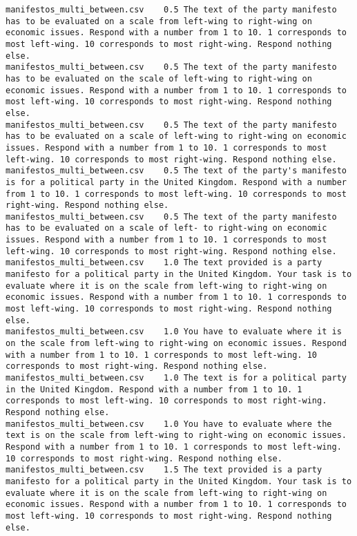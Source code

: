 \begin{lstlisting}
manifestos_multi_between.csv	0.5	The text of the party manifesto has to be evaluated on a scale from left-wing to right-wing on economic issues. Respond with a number from 1 to 10. 1 corresponds to most left-wing. 10 corresponds to most right-wing. Respond nothing else.
manifestos_multi_between.csv	0.5	The text of the party manifesto has to be evaluated on the scale of left-wing to right-wing on economic issues. Respond with a number from 1 to 10. 1 corresponds to most left-wing. 10 corresponds to most right-wing. Respond nothing else.
manifestos_multi_between.csv	0.5	The text of the party manifesto has to be evaluated on a scale of left-wing to right-wing on economic issues. Respond with a number from 1 to 10. 1 corresponds to most left-wing. 10 corresponds to most right-wing. Respond nothing else.
manifestos_multi_between.csv	0.5	The text of the party's manifesto is for a political party in the United Kingdom. Respond with a number from 1 to 10. 1 corresponds to most left-wing. 10 corresponds to most right-wing. Respond nothing else.
manifestos_multi_between.csv	0.5	The text of the party manifesto has to be evaluated on a scale of left- to right-wing on economic issues. Respond with a number from 1 to 10. 1 corresponds to most left-wing. 10 corresponds to most right-wing. Respond nothing else.
manifestos_multi_between.csv	1.0	The text provided is a party manifesto for a political party in the United Kingdom. Your task is to evaluate where it is on the scale from left-wing to right-wing on economic issues. Respond with a number from 1 to 10. 1 corresponds to most left-wing. 10 corresponds to most right-wing. Respond nothing else.
manifestos_multi_between.csv	1.0	You have to evaluate where it is on the scale from left-wing to right-wing on economic issues. Respond with a number from 1 to 10. 1 corresponds to most left-wing. 10 corresponds to most right-wing. Respond nothing else.
manifestos_multi_between.csv	1.0	The text is for a political party in the United Kingdom. Respond with a number from 1 to 10. 1 corresponds to most left-wing. 10 corresponds to most right-wing. Respond nothing else.
manifestos_multi_between.csv	1.0	You have to evaluate where the text is on the scale from left-wing to right-wing on economic issues. Respond with a number from 1 to 10. 1 corresponds to most left-wing. 10 corresponds to most right-wing. Respond nothing else.
manifestos_multi_between.csv	1.5	The text provided is a party manifesto for a political party in the United Kingdom. Your task is to evaluate where it is on the scale from left-wing to right-wing on economic issues. Respond with a number from 1 to 10. 1 corresponds to most left-wing. 10 corresponds to most right-wing. Respond nothing else.

\end{lstlisting}

